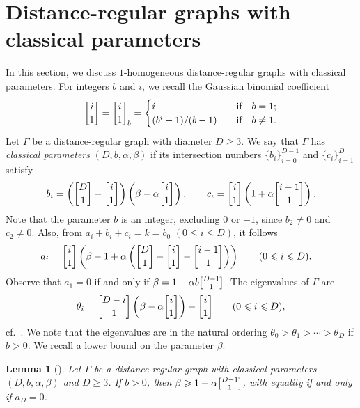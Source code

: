 \documentclass[11pt]{article}
\newtheorem{lemma}[theo]{Lemma}
\theoremstyle{definition}
\numberwithin{equation}{section}
\numberwithin{equation}{section}
\begin{document}
\section{Distance-regular graphs with classical parameters}\label{sec:DRG-cp}
In this section, we discuss $1$-homogeneous distance-regular graphs with classical parameters.
For integers $b$ and $i$, we recall the Gaussian binomial coefficient
\begin{equation*}
	\genfrac{\lbrack}{\rbrack}{0pt}{}{i}{1}= \genfrac{\lbrack}{\rbrack}{0pt}{}{i}{1}_b 
	=\begin{cases} 
		i & \quad \text{if} \quad b = 1;\\
		(b^i-1)/(b-1) & \quad \text{if} \quad b\ne 1.
	\end{cases}
\end{equation*}
Let $\Gamma$ be a distance-regular graph with diameter $D \geqslant 3$.
We say that $\Gamma$ has \emph{classical parameters} $(D,b,\alpha, \beta)$ if its intersection numbers  $\{b_i\}^{D-1}_{i=0}$ and $\{c_i\}^D_{i=1}$ satisfy
\begin{equation}\label{clasic parameters}
	b_i = \left(\genfrac{\lbrack}{\rbrack}{0pt}{}{D}{1} -\genfrac{\lbrack}{\rbrack}{0pt}{}{i}{1}\right)\left(\beta -\alpha \genfrac{\lbrack}{\rbrack}{0pt}{}{i}{1}\right),
	\qquad 
	c_i = \genfrac{\lbrack}{\rbrack}{0pt}{}{i}{1}\left(1 + \alpha \genfrac{\lbrack}{\rbrack}{0pt}{}{i-1}{1}\right).
\end{equation}
Note that the parameter $b$ is an integer, excluding $0$ or $-1$, since $b_2 \neq 0$ and $c_2 \neq 0$. 
Also, from $a_i + b_i + c_i = k = b_0$ $(0 \leqslant i \leqslant D)$, it follows
\begin{align}
	a_i & = \genfrac{\lbrack}{\rbrack}{0pt}{}{i}{1}\left( \beta-1+\alpha\left( \genfrac{\lbrack}{\rbrack}{0pt}{}{D}{1}-\genfrac{\lbrack}{\rbrack}{0pt}{}{i}{1} - \genfrac{\lbrack}{\rbrack}{0pt}{}{i-1}{1} \right) \right) \qquad (0\leqslant i \leqslant D). \label{eq:formula ai}
\end{align}
Observe that $a_1=0$ if and only if $\beta = 1-\alpha b \genfrac{\lbrack}{\rbrack}{0pt}{}{D-1}{1}$.
The eigenvalues of $\Gamma$ are 
\begin{equation}\label{eq:eig CP}
	\theta_i = \genfrac{\lbrack}{\rbrack}{0pt}{}{D-i}{1}\left( \beta - \alpha \genfrac{\lbrack}{\rbrack}{0pt}{}{i}{1} \right) - \genfrac{\lbrack}{\rbrack}{0pt}{}{i}{1} \qquad (0\leqslant i \leqslant D),
\end{equation}
cf.~\cite[Corollary 8.4.2]{BCN}.
We note that the eigenvalues are in the natural ordering $\theta_0 > \theta_1> \cdots > \theta_D$ if $b>0$.
We recall a lower bound on the parameter $\beta$.
\begin{lemma}[{\cite[Proposition 1]{JV2017}}]\label{beta}
Let $\Gamma$ be a distance-regular graph with classical parameters $(D,b,\alpha, \beta)$ and $D \geqslant 3$. 
If $b > 0$, then $\beta \geqslant 1 +\alpha \genfrac{\lbrack}{\rbrack}{0pt}{}{D-1}{1}$, with equality if and only if $a_D=0$.
\end{lemma}
\end{document}

